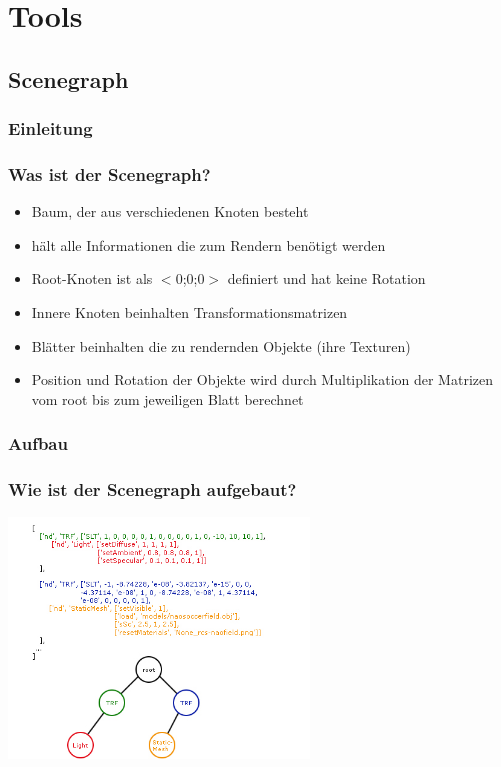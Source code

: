 
\section{Tools}
\subsection{Scenegraph}

 
 
\subsubsection{Einleitung}
\frame %
{
  \frametitle{Was ist der Scenegraph?} %
	  \begin{itemize}
	  \item Baum, der aus verschiedenen Knoten besteht
	  \item hält alle Informationen die zum Rendern benötigt werden
	  \item Root-Knoten ist als $<$0;0;0$>$ definiert und hat keine Rotation
	  \item Innere Knoten beinhalten Transformationsmatrizen
	  \item Blätter beinhalten die zu rendernden Objekte (ihre Texturen)
	  \item Position und Rotation der Objekte wird durch Multiplikation der Matrizen vom root bis zum jeweiligen Blatt berechnet
	\end{itemize}
}

\subsubsection{Aufbau}
\frame
{
  \frametitle{Wie ist der Scenegraph aufgebaut?} %
  \begin{center}
  	\includegraphics[width=0.6\textwidth]{Scene}
  \end{center}
	
}

